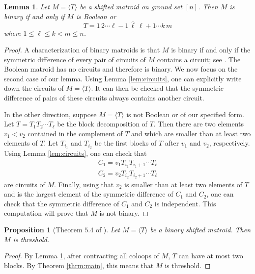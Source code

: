 \documentclass{amsart}
\theoremstyle{definition}
\theoremstyle{plain}
\newtheorem{lemma}[defn]{Lemma}
\newtheorem{prop}[defn]{Proposition}
\begin{document}
\begin{lemma}
\label{lem:binary}
Let $M= \langle T \rangle$ be a shifted matroid on ground set $[n]$. Then $M$ is binary if and only if $M$ is Boolean or
\[T  = 1\,2\cdots \ell-1\, \hat \ell\, \ell+1\cdots k\, m  \]
where $1\leq \ell \leq k < m \leq n$.
\end{lemma}
\begin{proof}
 A characterization of binary matroids is that $M$ is binary if and only if the symmetric difference of every pair of circuits of $M$ contains a circuit; see \cite[Theorem $9.1.2$]{oxley}. The Boolean matroid has no circuits and therefore is binary. We now focus on the second case of our lemma. Using Lemma \ref{lem:circuits}, one can explicitly write down the circuits of $M=\langle T \rangle$. It can then be checked that the symmetric difference of pairs of these circuits always contains another circuit.

In the other direction, suppose $M=\langle T\rangle$ is not Boolean or of our specified form. Let $T=T_1T_2\cdots T_\ell$ be the block decomposition of $T$. Then there are two elements $v_1<v_2$ contained in the complement of $T$ and which are smaller than at least two elements of $T$. Let $T_{i_1}$ and $T_{i_2}$ be the first blocks of $T$ after $v_1$ and $v_2$, respectively. Using Lemma \ref{lem:circuits}, one can check that 
\begin{gather*}
C_1 = v_1 T_{i_1} T_{i_1+1} \cdots T_\ell\\
C_2 = v_2 T_{i_2} T_{i_2+1} \cdots T_\ell
\end{gather*}
are circuits of $M$. Finally, using that $v_2$ is smaller than at least two elements of $T$ and is the largest element of the symmetric difference of $C_1$ and $C_2$, one can check that the symmetric difference of $C_1$ and $C_2$ is independent. This computation will prove that $M$ is not binary.
\end{proof}
\begin{prop}[Theorem $5.4$ of \cite{DO}]
Let $M=\langle T \rangle $ be a binary shifted matroid. Then $M$ is threshold.
\end{prop}
\begin{proof}
By Lemma \ref{lem:binary}, after contracting all coloops of $M$, $T$ can have at most two blocks. By Theorem \ref{thrm:main}, this means that $M$ is threshold.
\end{proof}
\end{document}
